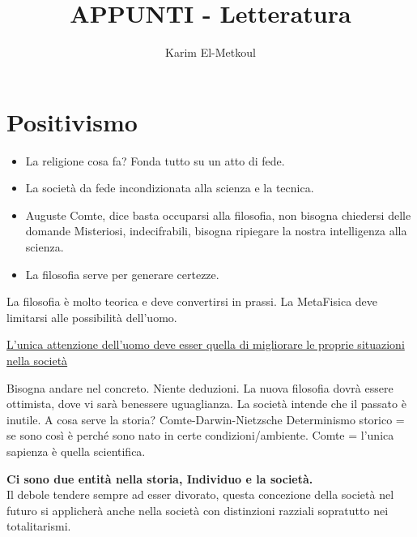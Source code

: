 \documentclass{article}
\title{APPUNTI - Letteratura}
\author{Karim El-Metkoul}
\begin{document}
\maketitle
\section{Positivismo}

\begin{itemize}
    \item La religione cosa fa? Fonda tutto su un atto di fede.
    \item La società da fede incondizionata alla scienza e la tecnica.
    \item Auguste Comte, dice basta occuparsi alla filosofia, non bisogna chiedersi delle domande
    Misteriosi, indecifrabili, bisogna ripiegare la nostra intelligenza alla scienza. 
    \item La filosofia serve per generare certezze.
\end{itemize}
\vspace{.5cm}
La filosofia è molto teorica e deve convertirsi in prassi.
La MetaFisica deve limitarsi alle possibilità dell'uomo.

\underline{L'unica attenzione dell'uomo deve esser quella di migliorare le proprie situazioni nella società}

Bisogna andare nel concreto. Niente deduzioni.
La nuova filosofia dovrà essere ottimista, dove vi sarà benessere uguaglianza.
La società intende che il passato è inutile.
A cosa serve la storia? 
Comte-Darwin-Nietzsche 
Determinismo storico = se sono così è perché sono nato in certe condizioni/ambiente.
Comte = l'unica sapienza è quella scientifica.

\textbf{Ci sono due entità nella storia,  Individuo e la società.}\\
Il debole tendere sempre ad esser divorato, questa concezione della società nel futuro si applicherà anche nella società con distinzioni razziali sopratutto nei totalitarismi.
\end{document}
